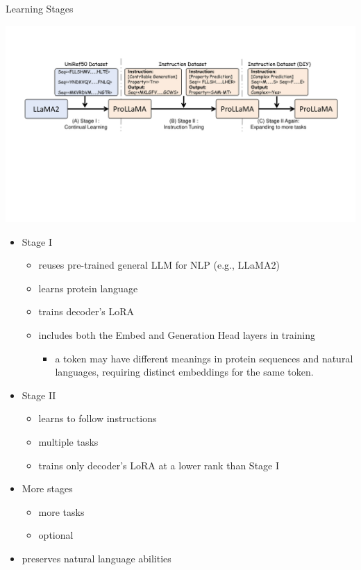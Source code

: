 \begin{frame}[shrink=30]{Learning Stages}
	\begin{center}
		\includegraphics[scale=0.5]{images/training.pdf}
	\end{center}
	\begin{itemize}
		\item Stage I
		\begin{itemize}
			\item reuses pre-trained general LLM for NLP (e.g., LLaMA2)
			\item learns protein language
			\item trains decoder's LoRA
			\item includes both the Embed and Generation Head layers in training
			\begin{itemize}
				\item a token may have different meanings in protein
				sequences and natural languages, requiring distinct embeddings for the same token.
			\end{itemize}
		\end{itemize}
		\item Stage II
		\begin{itemize}
			\item learns to follow instructions
			\item multiple tasks
			\item trains only decoder's LoRA at a lower rank than Stage I
		\end{itemize}
		\item More stages
		\begin{itemize}
			\item more tasks
			\item optional
		\end{itemize}
		\item preserves natural language abilities
	\end{itemize}
\end{frame}